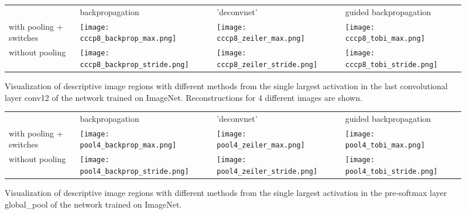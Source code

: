 \documentclass{article} \usepackage{iclr2015,times}
\begin{document}
\begin{appendix}
\begin{figure}[h]
\begin{center}
\begin{tabular}{ >{\centering\arraybackslash} m{1.5cm} >{\centering\arraybackslash} m{3.5cm} >{\centering\arraybackslash} m{3.5cm} >{\centering\arraybackslash} m{3.5cm} }
   & backpropagation & 'deconvnet' & guided backpropagation \\
  with pooling + switches & 
  \texttt{[image: cccp8\_backprop\_max.png]} &
  \texttt{[image: cccp8\_zeiler\_max.png]} &
  \texttt{[image: cccp8\_tobi\_max.png]} \\
  without pooling & 
  \texttt{[image: cccp8\_backprop\_stride.png]} &
  \texttt{[image: cccp8\_zeiler\_stride.png]} &
  \texttt{[image: cccp8\_tobi\_stride.png]} 
\end{tabular}
\end{center}
\caption{Visualization of descriptive image regions with different methods from the single largest activation in the last convolutional layer conv12 of the network trained on ImageNet. Reconstructions for 4 different images are shown.}
\label{fig:cccp8_different_methods}
\end{figure}

\begin{figure}[h]
\begin{center}
\begin{tabular}{ >{\centering\arraybackslash} m{1.5cm} >{\centering\arraybackslash} m{3.5cm} >{\centering\arraybackslash} m{3.5cm} >{\centering\arraybackslash} m{3.5cm} }
   & backpropagation & 'deconvnet' & guided backpropagation \\
  with pooling + switches & 
  \texttt{[image: pool4\_backprop\_max.png]} &
  \texttt{[image: pool4\_zeiler\_max.png]} &
  \texttt{[image: pool4\_tobi\_max.png]} \\
  without pooling & 
  \texttt{[image: pool4\_backprop\_stride.png]} &
  \texttt{[image: pool4\_zeiler\_stride.png]} &
  \texttt{[image: pool4\_tobi\_stride.png]} 
\end{tabular}
\end{center}
\caption{Visualization of descriptive image regions with different methods from the single largest activation in the pre-softmax layer global\_pool of the network trained on ImageNet.}
\label{fig:pool4_different_methods}
\end{figure}


\end{appendix}
\end{document}
